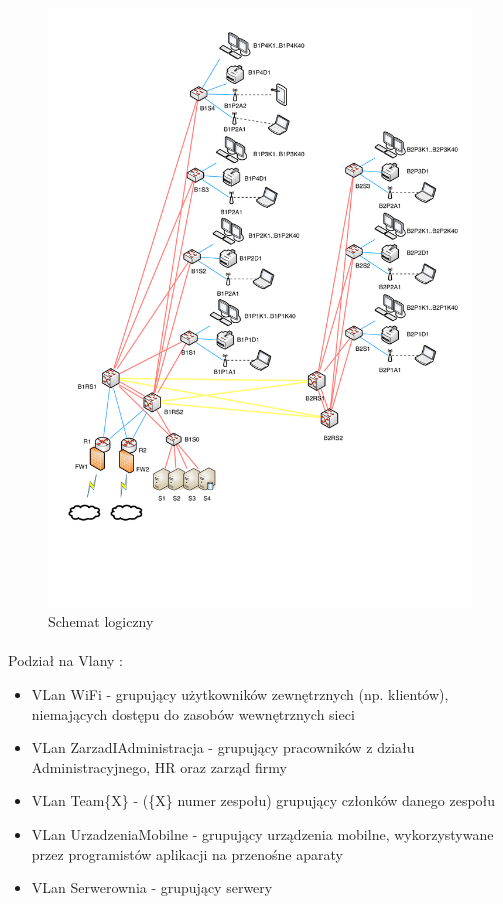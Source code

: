 \newpage
\begin{figure}[H]
  \begin{center}
    \includegraphics[width=\textwidth]{img/schemat.pdf}
    \caption{Schemat logiczny}
  \end{center}
\end{figure}


\paragraph{}
Podział na Vlany :
\begin{itemize}
	\item VLan WiFi - grupujący użytkowników zewnętrznych (np. klientów), niemających dostępu do zasobów wewnętrznych sieci
	\item VLan ZarzadIAdministracja - grupujący pracowników z działu Administracyjnego, HR oraz zarząd firmy
	\item VLan Team\{X\} - (\{X\} numer zespołu) grupujący członków danego zespołu
	\item VLan UrzadzeniaMobilne - grupujący urządzenia mobilne, wykorzystywane przez programistów aplikacji na przenośne aparaty
	\item VLan Serwerownia - grupujący serwery
\end{itemize}





